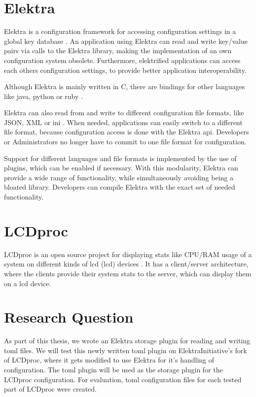 \documentclass[draft,final]{vutinfth} %
\begin{document}
\section{Elektra}
Elektra is a configuration framework for accessing configuration settings in a global key database \cite{elektramain}.
An application using Elektra can read and write key/value pairs via calls to the Elektra library, making the implementation of an own configuration system obsolete.
Furthermore, elektrified applications can access each others configuration settings, to provide better application interoperability.

Although Elektra is mainly written in C, there are bindings for other languages like java, python or ruby \cite{elektrabindings}.

Elektra can also read from and write to different configuration file formats, like JSON, XML or ini \cite{elektrastorage}.
When needed, applications can easily switch to a different file format, because configuration access is done with the Elektra \acrshort{api}.
Developers or Administrators no longer have to commit to one file format for configuration.

Support for different languages and file formats is implemented by the use of plugins, which can be enabled if necessary.
With this modularity, Elektra can provide a wide range of functionality, while simultaneously avoiding being a bloated library.
Developers can compile Elektra with the exact set of needed functionality.

\section{LCDproc}
LCDproc is an open source project for displaying stats like CPU/RAM usage of a system on different kinds of \acrshort{lcd} (\acrlong{lcd}) devices \cite{lcdprocmain}\cite{lcdprocgit}.
It has a client/server architecture, where the clients provide their system stats to the server, which can display them on a \acrshort{lcd} device.

\section{Research Question}
As part of this thesis, we wrote an Elektra storage plugin for reading and writing \acrshort{toml} files.
We will test this newly written \acrshort{toml} plugin on ElektraInitiative's fork of LCDproc, where it gets modified to use Elektra for it's handling of configuration.
The \acrshort{toml} plugin will be used as the storage plugin for the LCDproc configuration.
For evaluation, \acrshort{toml} configuration files for each tested part of LCDproc were created.
\end{document}
